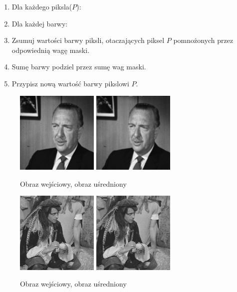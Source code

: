 \documentclass[final,a4paper,openany,12pt]{mwbk}
\begin{document}
\begin{enumerate}
	\item Dla każdego piksla($P$):
	\item Dla każdej barwy:
	\item Zsumuj wartości barwy piksli, otaczających piksel $P$ pomnożonych przez odpowiednią wagę maski.
	\item Sumę barwy podziel przez sumę wag maski.
	\item Przypisz nową wartość barwy pikslowi $P$.
\end{enumerate}

\begin{figure}[H]
	\begin{center}
		\includegraphics[width=0.35\textwidth]{gentelman_gray}
		\includegraphics[width=0.35\textwidth]{gentelman_gray_lowpassAvg_result}
	\end{center}
	\caption{Obraz wejściowy, obraz uśredniony}
\end{figure}

\begin{figure}[H]
	\begin{center}
		\includegraphics[width=0.35\textwidth]{pirate_gray}
		\includegraphics[width=0.35\textwidth]{pirate_gray_lowpassAvg_result}
	\end{center}
	\caption{Obraz wejściowy, obraz uśredniony}
\end{figure}
\end{document}
